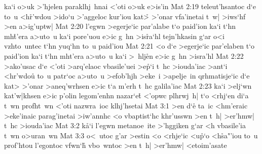ka`i
o>uk
>'hjelen
paraklhj~hnai
<'oti
o>uk
e>is'in\bibvsend
\vs Mat 2:19
teleut'hsantoc
d`e
to~u
<h\r{r}'wdou
>ido`u
>'aggeloc
kur'iou
kat>\r{}
>'onar
vfa'inetai
t~w|
>iws`hf
>en
a>ig'uptw|\bibvsend
\vs Mat 2:20
l'egwn
>egerje`ic
par'alabe
t`o
paid'ion
ka`i
t`hn
mh\r{t}'era
a>uto~u
ka`i
pore'uou
e>ic
g~hn
>is\r{r}a`hl
tejn'hkasin
g`ar
o<i
vzhto~untec
t`hn
yuq`hn
to~u
paid'iou\bibvsend
\vs Mat 2:21
<o
d`e
>egerje`ic
par'elaben
t`o
paid'ion
ka`i
t`hn
mht'era
a>uto~u
ka`i
>~hlj\r{e}n
e>ic
g~hn
>isra'hl\bibvsend
\vs Mat 2:22
>ako'usac
d`e
<'oti
>arq'elaoc
vbasile'uei
>e\r{p}`i
t~hc
>iouda'iac
>ant`i
<hr'wdou\r{}
to~u
patr`oc
a>uto~u
>efob'hjh
>eke~i
>apelje~in
qrhmatisje`ic
d`e
kat>
>'onar
>aneq'wrhsen
e>ic
t`a
m'erh
t~hc
galila'iac\bibvsend
\vs Mat 2:23
ka`i
>elj`wn
kat'w|khsen
e>ic
p'olin
legom'enhn
nazar`e\r{t}
<'opwc
plhrwj~h|
t`o
<rhj`en
di`a
t~wn
profht~wn
<'oti
nazwra~ioc
klhj'hsetai\bibvsend
\vs Mat 3:1
>en
d`e\r{}
ta~ic
<hm'eraic
>eke'inaic
parag'inetai
>iw'annhc
<o
vbaptist`hc
khr'usswn
>en
t~h|
>er'hmw|
t~hc
>iouda'iac\bibvsend
\vs Mat 3:2
k\r{a}`i
l'egwn
metanoe~ite
>'hggiken
g`ar
<h
vbasile'ia
t~wn
o>uran~wn\bibvsend
\vs Mat 3:3
o<~utoc
g'ar
>estin
<o
<rhje`ic
<u\r{p}`o
<h\r{s}a"'iou
to~u
prof'htou
l'egontoc
vfwn`h\r{}
vbo~wntoc
>en
t~h|
>er'hmw|
<etoim'asate
